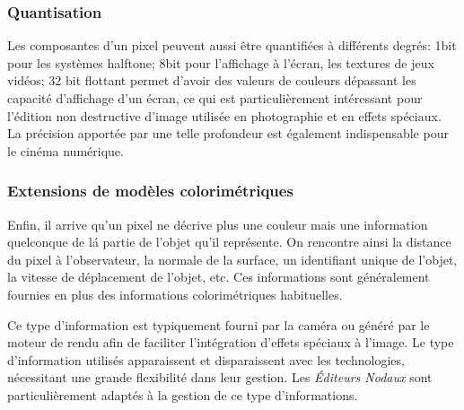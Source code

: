 			\subsubsection{Quantisation}
			Les composantes d'un pixel peuvent aussi être quantifiées à différents degrés: 1bit pour les systèmes halftone; 8bit pour l'affichage 
			à l'écran,  les textures de jeux vidéos; 32 bit flottant permet d'avoir des valeurs de couleurs dépassant les capacité d'affichage
			d'un écran, ce qui est particulièrement intéressant pour l'édition non destructive d'image utilisée en photographie et en 
			effets spéciaux. La précision apportée par une telle profondeur est également indispensable pour le cinéma numérique.

			\subsubsection{Extensions de modèles colorimétriques}

			Enfin, il arrive qu'un pixel ne décrive plus une couleur mais une information quelconque de lá partie de l'objet qu'il représente.
			On rencontre ainsi la distance du pixel à l'observateur, la normale de la surface, un identifiant unique de l'objet, la vitesse de
			déplacement de l'objet, etc. Ces informations sont généralement fournies en plus des informations colorimétriques habituelles.

			Ce type d'information est typiquement fourni par la caméra ou généré par le moteur de rendu afin de faciliter l'intégration d'effets
			spéciaux à l'image. Le type d'information utilisés apparaissent et disparaissent avec les technologies, nécessitant une grande 
			flexibilité dans leur gestion. Les \emph{Éditeurs Nodaux} sont particulièrement adaptés à la gestion de ce type d'informations.
			
